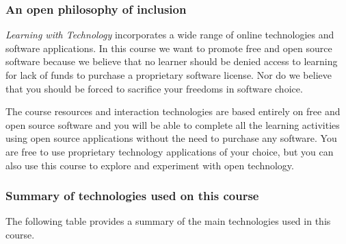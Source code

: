 \documentclass[
]{book}
\theoremstyle{definition}
\theoremstyle{definition}
\theoremstyle{definition}
\theoremstyle{definition}
\theoremstyle{remark}
\begin{document}
\hypertarget{an-open-philosophy-of-inclusion}{%
\subsubsection*{An open philosophy of inclusion}\label{an-open-philosophy-of-inclusion}}

\emph{Learning with Technology} incorporates a wide range of online technologies and software applications. In this course we want to promote free and open source software because we believe that no learner should be denied access to learning for lack of funds to purchase a proprietary software license. Nor do we believe that you should be forced to sacrifice your freedoms in software choice.

The course resources and interaction technologies are based entirely on free and open source software and you will be able to complete all the learning activities using open source applications without the need to purchase any software. You are free to use proprietary technology applications of your choice, but you can also use this course to explore and experiment with open technology.

\hypertarget{summary-of-technologies-used-on-this-course}{%
\subsubsection*{Summary of technologies used on this course}\label{summary-of-technologies-used-on-this-course}}

The following table provides a summary of the main technologies used in this course.
\end{document}
